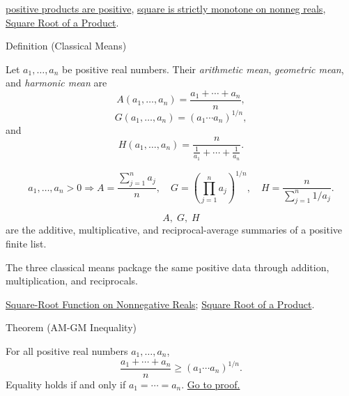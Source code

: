 \begin{dependencies}
\hyperref[lem:positive-product]{positive products are positive},
\hyperref[thm:ineq-square-monotone]{square is strictly monotone on nonneg reals},
\hyperref[thm:sqrt-product]{Square Root of a Product}.
\end{dependencies}


\begin{definitionbox}{Definition (Classical Means)}
\begin{definition}
\label{def:classical-means}
Let $a_1,\dots,a_n$ be positive real numbers. Their \emph{arithmetic mean},
\emph{geometric mean}, and \emph{harmonic mean} are
\[
A(a_1,\dots,a_n)=\frac{a_1+\cdots+a_n}{n},
\]
\[
G(a_1,\dots,a_n)=(a_1\cdots a_n)^{1/n},
\]
and
\[
H(a_1,\dots,a_n)=
\frac{n}{\frac1{a_1}+\cdots+\frac1{a_n}}.
\]
\end{definition}
\end{definitionbox}

\begin{remark*}
\[
a_1,\dots,a_n>0
\Rightarrow
A=\frac{\sum_{j=1}^{n}a_j}{n},\quad
G=\left(\prod_{j=1}^{n}a_j\right)^{1/n},\quad
H=\frac{n}{\sum_{j=1}^{n}1/a_j}.
\]
\end{remark*}

\begin{remark*}
\[
A,\;G,\;H
\]
are the additive, multiplicative, and reciprocal-average summaries of a
positive finite list.
\end{remark*}

\begin{remark*}[Interpretation]
The three classical means package the same positive data through addition,
multiplication, and reciprocals.
\end{remark*}

\begin{dependencies}
\hyperref[def:real-square-root-function]{Square-Root Function on Nonnegative Reals};
\hyperref[thm:sqrt-product]{Square Root of a Product}.
\end{dependencies}

\begin{theorembox}{Theorem (AM-GM Inequality)}
\begin{theorem}[AM-GM Inequality]
\label{thm:ineq-am-gm}
For all positive real numbers $a_1,\dots,a_n$,
\[
\frac{a_1+\cdots+a_n}{n}
\ge
(a_1\cdots a_n)^{1/n}.
\]
Equality holds if and only if $a_1=\cdots=a_n$.
\hyperref[prf:ineq-am-gm]{Go to proof.}
\end{theorem}
\end{theorembox}

